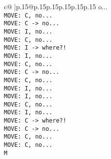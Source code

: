\documentclass{article}
\begin{document}
{\begin{supertabular}{c@{$\;$}|p{.15\linewidth}@{}p{.15\linewidth}p{.15\linewidth}p{.15\linewidth}p{.15\linewidth}p{.15\linewidth}}
{{{o...\\ \tt  MOVE: C, no...\\ \tt  MOVE: C -> no...\\ \tt  MOVE: I, no...\\ \tt  MOVE: C, no...\\ \tt  MOVE: I -> where?!\\ \tt  MOVE: I, no...\\ \tt  MOVE: C, no...\\ \tt  MOVE: C -> no...\\ \tt  MOVE: C, no...\\ \tt  MOVE: I, no...\\ \tt  MOVE: I, no...\\ \tt  MOVE: C, no...\\ \tt  MOVE: I, no...\\ \tt  MOVE: C -> where?!\\ \tt  MOVE: C -> no...\\ \tt  MOVE: C, no...\\ \tt  MOVE: C, no...\\ \tt  M}}}
\end{supertabular}}
\end{document}
